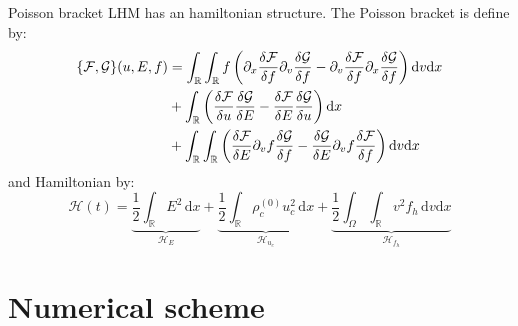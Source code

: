\documentclass{beamer}
\begin{document}
\begin{frame}{Poisson bracket}
  LHM has an hamiltonian structure. The Poisson bracket is define by:
  $$
    \begin{aligned}
      \{ {\cal F}, {\cal G} \}( u, E, f) &= \int_{\mathbb{R}}\int_{\mathbb{R}} f \left( \partial_x \frac{\delta {\cal F}}{\delta f}\partial_{v} \frac{\delta {\cal G}}{\delta f} - \partial_{v} \frac{\delta {\cal F}}{\delta f}\partial_{x} \frac{\delta {\cal G}}{\delta f}\right)\mathrm{d}v \mathrm{d}x \\
                           & + \int_{\mathbb{R}}  \left(  \frac{\delta {\cal F}}{\delta{ u}}  \frac{\delta {\cal G}}{\delta{ E}} - \frac{\delta {\cal F}}{\delta{ E}}  \frac{\delta {\cal G}}{\delta{u}} \right) \mathrm{d}x \\
                           & + \int_{\mathbb{R}}\int_{\mathbb{R}}  \left(  \frac{\delta {\cal F}}{\delta{ E}}  \partial_v f\frac{\delta {\cal G}}{\delta{ f}} - \frac{\delta {\cal G}}{\delta{ E}} \partial_v f \frac{\delta {\cal F}}{\delta{f}} \right) \mathrm{d}{ v}\mathrm{d}x \\
    \end{aligned}
  $$
  and Hamiltonian by:
  $$
    \mathcal{H}(t) = \underbrace{\frac{1}{2}\int_\mathbb{R}E^2\,\mathrm{d}x}_{\mathcal{H}_{E}}
                   + \underbrace{\frac{1}{2}\int_\mathbb{R}\rho_c^{(0)}u_c^2\,\mathrm{d}x}_{\mathcal{H}_{u_c}}
                   + \underbrace{\frac{1}{2}\int_\Omega\int_\mathbb{R}v^2f_h\,\mathrm{d}v\mathrm{d}x}_{\mathcal{H}_{f_h}}
  $$
\end{frame}

\section{Numerical scheme}
\end{document}
